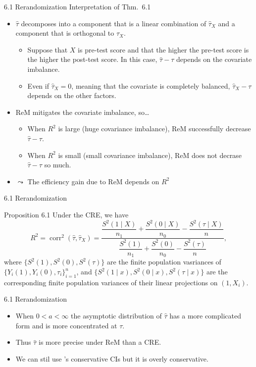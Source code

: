 \documentclass[aspectratio=169, 12pt]{beamer}
\begin{document}
\begin{frame}{6.1 Rerandomization}
  Interpretation of Thm.~6.1
  \begin{itemize}
    \item $\widehat{\tau}$ decomposes into a component that is a linear combination of $\widehat{\tau}_X$ and a component that is orthogonal to $\widehat{\tau}_X$.
    \begin{itemize}
      \item Suppose that $X$ is pre-test score and that the higher the pre-test score is the higher the post-test score. In this case, $\widehat{\tau}-\tau$ depends on the covariate imbalance.
      \item Even if $\widehat{\tau}_X=0$, meaning that the covariate is completely balanced, $\widehat{\tau}_X-\tau$ depends on the other factors.
    \end{itemize}
    \item ReM mitigates the covariate imbalance, so\dots
    \begin{itemize}
      \item When $R^2$ is large (huge covariance imbalance), ReM successfully decrease $\widehat{\tau}-\tau$.
      \item When $R^2$ is small (small covariance imbalance), ReM does not decrase $\widehat{\tau}-\tau$ so much.
    \end{itemize}
    \item $\leadsto$ The efficiency gain due to ReM depends on $R^2$
  \end{itemize}
\end{frame}

\begin{frame}{6.1 Rerandomization}
  \begin{keybox}{Proposition 6.1}
    Under the CRE, we have
    \[
    R^2 = \operatorname{corr}^2(\widehat{\tau}, \widehat{\tau}_X) = \frac{\dfrac{S^2(1\mid X)}{n_1} + \dfrac{S^2(0\mid X)}{n_0} - \dfrac{S^2(\tau \mid X)}{n}}{\dfrac{S^2(1)}{n_1} + \dfrac{S^2(0)}{n_0} - \dfrac{S^2(\tau)}{n}},
    \]
    where $\{S^2(1), S^2(0), S^2(\tau)\}$ are the finite population vasriances of $\{Y_i(1),Y_i(0), \tau_i\}_{i=1}^{n}$, and $\{S^2(1\mid x), S^2(0 \mid x), S^2(\tau\mid x)\}$ are the corresponding finite population variances of their linear projections on $(1,X_i)$. 

  \end{keybox}
\end{frame}

\begin{frame}{6.1 Rerandomization}
  \begin{itemize}
    \item When $0<a<\infty$ the asymptotic distribution of $\widehat{\tau}$ has a more complicated form and is more concentrated at $\tau$.
    \item Thus $\widehat{\tau}$ is more precise under ReM than a CRE.
    \item We can stil use \citet{neyman1923application}'s conservative CIs but it is overly conservative.
  \end{itemize}
\end{frame}
\end{document}
